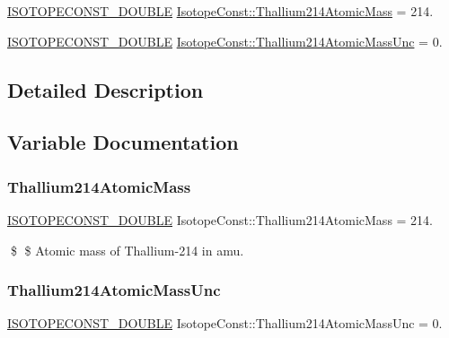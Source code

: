 \begin{DoxyCompactItemize}
\item 
\mbox{\hyperlink{group___isotope_const-_macros_ga8f45a7272ce02c0b4c65c44636ed719a}{I\+S\+O\+T\+O\+P\+E\+C\+O\+N\+S\+T\+\_\+\+D\+O\+U\+B\+LE}} \mbox{\hyperlink{group___isotope_const-_thallium-_tl214_ga229ff6af0f26076d70a6f9ebf6582309}{Isotope\+Const\+::\+Thallium214\+Atomic\+Mass}} = 214.
\item 
\mbox{\hyperlink{group___isotope_const-_macros_ga8f45a7272ce02c0b4c65c44636ed719a}{I\+S\+O\+T\+O\+P\+E\+C\+O\+N\+S\+T\+\_\+\+D\+O\+U\+B\+LE}} \mbox{\hyperlink{group___isotope_const-_thallium-_tl214_ga841c62ea3ea03462c69f9a78320d85a4}{Isotope\+Const\+::\+Thallium214\+Atomic\+Mass\+Unc}} = 0.
\end{DoxyCompactItemize}


\subsection{Detailed Description}


\subsection{Variable Documentation}
\mbox{\label{group___isotope_const-_thallium-_tl214_ga229ff6af0f26076d70a6f9ebf6582309}} 
\subsubsection{\texorpdfstring{Thallium214\+Atomic\+Mass}{Thallium214AtomicMass}}
{\footnotesize\ttfamily \mbox{\hyperlink{group___isotope_const-_macros_ga8f45a7272ce02c0b4c65c44636ed719a}{I\+S\+O\+T\+O\+P\+E\+C\+O\+N\+S\+T\+\_\+\+D\+O\+U\+B\+LE}} Isotope\+Const\+::\+Thallium214\+Atomic\+Mass = 214.}

\$ \$ Atomic mass of Thallium-\/214 in amu. \mbox{\label{group___isotope_const-_thallium-_tl214_ga841c62ea3ea03462c69f9a78320d85a4}} 
\subsubsection{\texorpdfstring{Thallium214\+Atomic\+Mass\+Unc}{Thallium214AtomicMassUnc}}
{\footnotesize\ttfamily \mbox{\hyperlink{group___isotope_const-_macros_ga8f45a7272ce02c0b4c65c44636ed719a}{I\+S\+O\+T\+O\+P\+E\+C\+O\+N\+S\+T\+\_\+\+D\+O\+U\+B\+LE}} Isotope\+Const\+::\+Thallium214\+Atomic\+Mass\+Unc = 0.}

